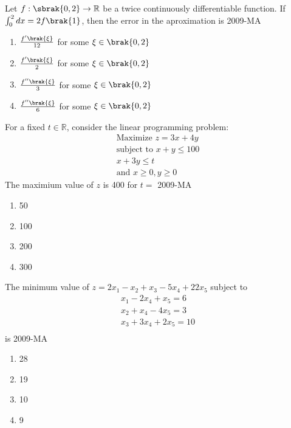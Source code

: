 	\item Let $f: \sbrak{0,2}\to \mathbb{R}$ be a twice continuously differentiable function. If $\int_{0}^{2} dx=2f\brak{1}$, then the error in the aproximation is
\hfill{2009-MA}
	\begin{multicols}{2}
	\begin{enumerate}
		\item $\frac{f'\brak{\xi}}{12}$ for some $\xi \in \brak{0,2}$
		\item $\frac{f'\brak{\xi}}{2}$ for some $\xi \in \brak{0,2}$
 		\item $\frac{f''\brak{\xi}}{3}$ for some $\xi \in \brak{0,2}$
		\item $\frac{f''\brak{\xi}}{6}$ for some $\xi \in \brak{0,2}$
	\end{enumerate}
	\end{multicols}

	\item For a fixed $t \in \mathbb{R}$, consider the linear programming problem:
\begin{align*}
\text{Maximize } z=3x+4y \\
\text{subject to } x+y \leq 100 \\
x+3y \leq t \\
\text{and } x \geq 0, y\geq 0
\end{align*}
The maximium value of $z$ is 400 for $t=$ 
\hfill{2009-MA}
	\begin{multicols}{4}
	\begin{enumerate}
		\item 50
		\item 100
		\item 200
		\item 300
	\end{enumerate}
	\end{multicols}

\item The minimum value of $z=2x_{1}-x_{2}+x_{3}-5x_{4}+22x_{5}$ subject to
\begin{align*}
	x_{1}-2x_{4}+x_{5}=6\\
	x_{2}+x_{4}-4x_{5}=3\\
	x_{3}+3x_{4}+2x_{5}=10\\
\end{align*}
is
\hfill{2009-MA}
	\begin{multicols}{4}
	\begin{enumerate}
		\item 28
		\item 19
		\item 10
		\item 9
	\end{enumerate}
	\end{multicols}
	
